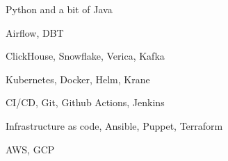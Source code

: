 \item Python and a bit of Java
\item Airflow, DBT
\item ClickHouse, Snowflake, Verica, Kafka
\item Kubernetes, Docker, Helm, Krane
\item CI/CD, Git, Github Actions, Jenkins
\item Infrastructure as code, Ansible, Puppet, Terraform
\item AWS, GCP
